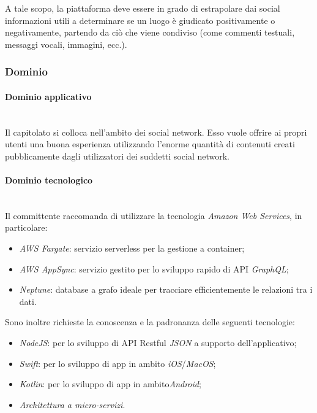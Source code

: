 \documentclass[11pt]{article}
\begin{document}
    A tale scopo, la piattaforma deve essere in grado di estrapolare dai social informazioni utili a determinare se un luogo è giudicato
    positivamente o negativamente, partendo da ciò che viene condiviso (come commenti testuali, messaggi vocali, immagini, ecc.).
    
    \subsubsection{Dominio}
        \paragraph{Dominio applicativo}~\\
        
        \noindent
        Il capitolato si colloca nell'ambito dei social network. Esso vuole offrire ai propri utenti una buona esperienza utilizzando
        l'enorme quantità di contenuti creati pubblicamente dagli utilizzatori dei suddetti social network.
        
        \paragraph{Dominio tecnologico}~\\
        
        \noindent
        Il committente raccomanda di utilizzare la tecnologia \textit{Amazon Web Services}, in particolare:
		\begin{itemize}
			\item \textit{AWS Fargate}: servizio serverless per la gestione a container;
			\item \textit{AWS AppSync}: servizio gestito per lo sviluppo rapido di API \textit{GraphQL};
			\item \textit{Neptune}: database a grafo ideale per tracciare efficientemente le relazioni tra i dati.
		\end{itemize}
		Sono inoltre richieste la conoscenza e la padronanza delle seguenti tecnologie:
		\begin{itemize}
			\item \textit{NodeJS}: per lo sviluppo di API Restful \textit{JSON} a supporto dell'applicativo;
			\item \textit{Swift}: per lo sviluppo di app in ambito \textit{iOS}/\textit{MacOS};
			\item \textit{Kotlin}: per lo sviluppo di app in ambito\textit{Android};
			\item \textit{Architettura a micro-servizi}.
		\end{itemize}
    
\end{document}
